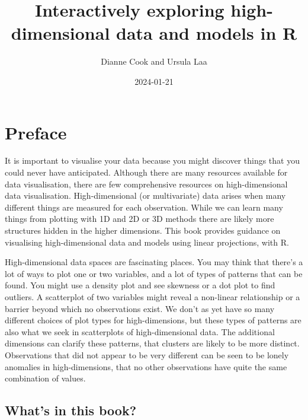\documentclass[
  letterpaper,
]{krantz}
\title{Interactively exploring high-dimensional data and models in R}
\author{Dianne Cook and Ursula Laa}
\date{2024-01-21}
\renewcommand*\contentsname{Table of contents}
\newcommand\contentsname{Table of contents}
\begin{document}
\maketitle
\ifdefined\Shaded\renewenvironment{Shaded}{\begin{tcolorbox}[frame hidden, enhanced, boxrule=0pt, borderline west={3pt}{0pt}{shadecolor}, interior hidden, sharp corners, breakable]}{\end{tcolorbox}}\fi

\renewcommand*\contentsname{Table of contents}
{
\hypersetup{linkcolor=}
\setcounter{tocdepth}{2}
\tableofcontents
}

\hypertarget{preface}{%
\chapter*{Preface}\label{preface}}


It is important to visualise your data because you might discover things
that you could never have anticipated. Although there are many resources
available for data visualisation, there are few comprehensive resources
on high-dimensional data visualisation. High-dimensional (or
multivariate) data arises when many different things are measured for
each observation. While we can learn many things from plotting with 1D
and 2D or 3D methods there are likely more structures hidden in the
higher dimensions. This book provides guidance on visualising
high-dimensional data and models using linear projections, with R.

High-dimensional data spaces are fascinating places. You may think that
there's a lot of ways to plot one or two variables, and a lot of types
of patterns that can be found. You might use a density plot and see
skewness or a dot plot to find outliers. A scatterplot of two variables
might reveal a non-linear relationship or a barrier beyond which no
observations exist. We don't as yet have so many different choices of
plot types for high-dimensions, but these types of patterns are also
what we seek in scatterplots of high-dimensional data. The additional
dimensions can clarify these patterns, that clusters are likely to be
more distinct. Observations that did not appear to be very different can
be seen to be lonely anomalies in high-dimensions, that no other
observations have quite the same combination of values.

\hypertarget{whats-in-this-book}{%
\section*{What's in this book?}\label{whats-in-this-book}}
\end{document}
